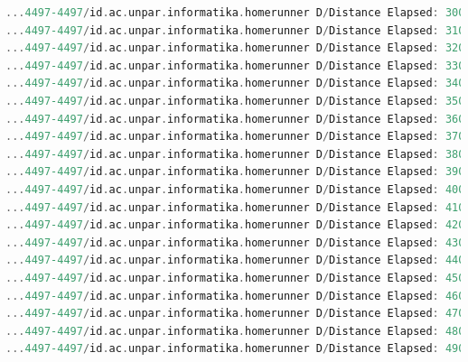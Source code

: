 \begin{lstlisting}[language=C,frame=single,caption=\textit{Log console} yang Menampilkan Jarak Tempuh Pengguna pada Perangkat 1,label=note8log]
...4497-4497/id.ac.unpar.informatika.homerunner D/Distance Elapsed: 3000 
...4497-4497/id.ac.unpar.informatika.homerunner D/Distance Elapsed: 3100 
...4497-4497/id.ac.unpar.informatika.homerunner D/Distance Elapsed: 3200 
...4497-4497/id.ac.unpar.informatika.homerunner D/Distance Elapsed: 3300 
...4497-4497/id.ac.unpar.informatika.homerunner D/Distance Elapsed: 3400 
...4497-4497/id.ac.unpar.informatika.homerunner D/Distance Elapsed: 3500 
...4497-4497/id.ac.unpar.informatika.homerunner D/Distance Elapsed: 3600 
...4497-4497/id.ac.unpar.informatika.homerunner D/Distance Elapsed: 3700 
...4497-4497/id.ac.unpar.informatika.homerunner D/Distance Elapsed: 3800 
...4497-4497/id.ac.unpar.informatika.homerunner D/Distance Elapsed: 3900 
...4497-4497/id.ac.unpar.informatika.homerunner D/Distance Elapsed: 4000 
...4497-4497/id.ac.unpar.informatika.homerunner D/Distance Elapsed: 4100 
...4497-4497/id.ac.unpar.informatika.homerunner D/Distance Elapsed: 4200 
...4497-4497/id.ac.unpar.informatika.homerunner D/Distance Elapsed: 4300 
...4497-4497/id.ac.unpar.informatika.homerunner D/Distance Elapsed: 4400 
...4497-4497/id.ac.unpar.informatika.homerunner D/Distance Elapsed: 4500 
...4497-4497/id.ac.unpar.informatika.homerunner D/Distance Elapsed: 4600 
...4497-4497/id.ac.unpar.informatika.homerunner D/Distance Elapsed: 4700 
...4497-4497/id.ac.unpar.informatika.homerunner D/Distance Elapsed: 4800 
...4497-4497/id.ac.unpar.informatika.homerunner D/Distance Elapsed: 4900
\end{lstlisting}

